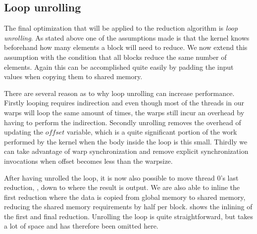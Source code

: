 \subsection{Loop unrolling}\label{sec:loopUnrolling}


The final optimization that will be applied to the reduction algorithm
is \textit{loop unrolling}. As stated above one of the assumptions
made is that the kernel knows beforehand how many elements a block
will need to reduce. We now extend this assumption with the condition
that all blocks reduce the same number of elements. Again this can be
accomplished quite easily by padding the input values when copying
them to shared memory. 

There are several reason as to why loop unrolling can increase
performance. Firstly looping requires indirection and even though most
of the threads in our warps will loop the same amount of times, the
warps still incur an overhead by having to perform the
indirection. Secondly unrolling removes the overhead of updating the
$offset$ variable, which is a quite significant portion of the work
performed by the kernel when the body inside the loop is this
small. Thirdly we can take advantage of warp synchronization and
remove explicit synchronization invocations when offset becomes less
than the warpsize.


After having unrolled the loop, it is now also possible to move thread
0's last reduction, , down to where the
result is output. We are also able to inline the first reduction where
the data is copied from global memory to shared memory, reducing the
shared memory requirements by half per
block.  shows the inlining of the first and
final reduction. Unrolling the loop is quite straightforward, but
takes a lot of space and has therefore been omitted here.


